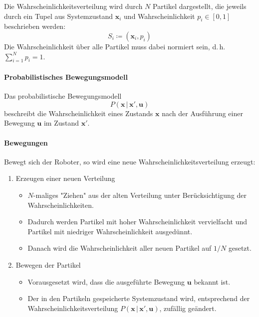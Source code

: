 \documentclass[a4paper, 11pt, accentcolor = tud3b]{tudreport}
\newcommand{\given}{\,\vert\,}
\renewcommand{\vec}[1]{\boldsymbol{\mathbf{#1}}}
\renewcommand{\dh}{d.\,h.~}
\begin{document}
					Die Wahrscheinlichkeitsverteilung wird durch \(N\) Partikel dargestellt, die jeweils durch ein Tupel aus Systemzustand \( \vec{x}_i \) und Wahrscheinlichkeit \( p_i \in [0, 1] \) beschrieben werden:
					\begin{equation*}
						S_i \coloneqq (\vec{x}_i, p_i)
					\end{equation*}
					Die Wahrscheinlichkeit über alle Partikel muss dabei normiert sein, \dh \( \sum_{i = 1}^{N} p_i = 1 \).
					
					\paragraph{Probabilistisches Bewegungsmodell}
						Das probabilistische Bewegungsmodell
						\begin{equation*}
							P(\vec{x} \given \vec{x}', \vec{u})
						\end{equation*}
						beschreibt die Wahrscheinlichkeit eines Zustands \( \vec{x} \) nach der Ausführung einer Bewegung \( \vec{u} \) im Zustand \( \vec{x}' \).
					
					\paragraph{Bewegungen}
						Bewegt sich der Roboter, so wird eine neue Wahrscheinlichkeitsverteilung erzeugt:
						\begin{enumerate}
							\item Erzeugen einer neuen Verteilung
								\begin{itemize}
									\item \(N\)-maliges "Ziehen" aus der alten Verteilung unter Berücksichtigung der Wahrscheinlichkeiten.
									\item Dadurch werden Partikel mit hoher Wahrscheinlichkeit vervielfacht und Partikel mit niedriger Wahrscheinlichkeit ausgedünnt.
									\item Danach wird die Wahrscheinlichkeit aller neuen Partikel auf \( 1/N \) gesetzt.
								\end{itemize}
							\item Bewegen der Partikel
								\begin{itemize}
									\item Vorausgesetzt wird, dass die ausgeführte Bewegung \( \vec{u} \) bekannt ist.
									\item Der in den Partikeln gespeicherte Systemzustand wird, entsprechend der Wahrscheinlichkeitsverteilung \( P(\vec{x} \given \vec{x}', \vec{u}) \), zufällig geändert.
								\end{itemize}
						\end{enumerate}
					
\end{document}

